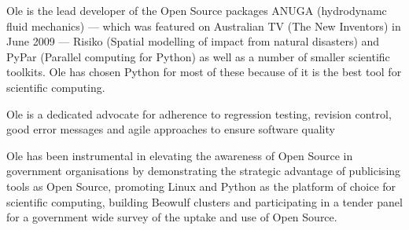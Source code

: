 \documentclass[11pt,a4paper]{article}
\begin{document}
Ole is the lead developer of the Open Source packages ANUGA
(hydrodynamc fluid mechanics) --- which was featured on Australian TV
(The New Inventors) in June 2009 --- Risiko (Spatial modelling of impact from natural disasters) and PyPar (Parallel computing for
Python) as well as a number of smaller scientific toolkits. Ole has chosen Python for most of these because of it is the best tool for scientific computing.

Ole is a
dedicated advocate for adherence to regression testing, revision
control, good error messages and agile approaches to ensure software quality

Ole has been instrumental in elevating the awareness of Open Source
in government organisations by demonstrating the strategic advantage
of publicising tools as Open Source, promoting Linux and Python as the
platform of choice for scientific computing, building Beowulf clusters
and participating in a tender panel for a government wide survey of
the uptake and use of Open Source.
\end{document}

